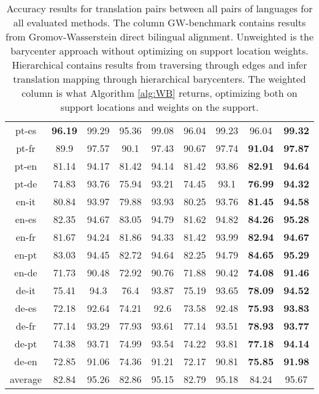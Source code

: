 \documentclass{article}
\begin{document}
\begin{table*}[t]
\begin{tabular}{c|cc|cc|cc|cc}
pt-es  &  \bf 96.19  &  99.29  &  95.36  &  99.08  &  96.04  &  99.23  &  96.04  &  \bf 99.32 \\
pt-fr  &  89.9  &  97.57  &  90.1  &  97.43  &  90.67  &  97.74  &  \bf 91.04  &  \bf 97.87 \\
pt-en  &  81.14  &  94.17  &  81.42  &  94.14  &  81.42  &  93.86  &  \bf 82.91  &  \bf 94.64 \\
pt-de  &  74.83  &  93.76  &  75.94  &  93.21  &  74.45  &  93.1  &  \bf 76.99  &  \bf 94.32 \\
en-it  &  80.84  &  93.97  &  79.88  &  93.93  &  80.25  &  93.76  &  \bf 81.45  &  \bf 94.58 \\
en-es  &  82.35  &  94.67  &  83.05  &  94.79  &  81.62  &  94.82  &  \bf 84.26  &  \bf 95.28 \\
en-fr  &  81.67  &  94.24  &  81.86  &  94.33  &  81.42  &  93.99  &  \bf 82.94  &  \bf 94.67 \\
en-pt  &  83.03  &  94.45  &  82.72  &  94.64  &  82.25  &  94.79  &  \bf 84.65  &  \bf 95.29 \\
en-de  &  71.73  &  90.48  &  72.92  &  90.76  &  71.88  &  90.42  &  \bf 74.08  &  \bf 91.46 \\
de-it  &  75.41  &  94.3  &  76.4  &  93.87  &  75.19  &  93.65  &  \bf 78.09  &  \bf 94.52 \\
de-es  &  72.18  &  92.64  &  74.21  &  92.6  &  73.58  &  92.48  &  \bf 75.93  &  \bf 93.83 \\
de-fr  &  77.14  &  93.29  &  77.93  &  93.61  &  77.14  &  93.51  &  \bf 78.93 &  \bf 93.77 \\
de-pt  &  74.38  &  93.71  &  74.99  &  93.54  &  74.22  &  93.81  &  \bf 77.18  &  \bf 94.14 \\
de-en  &  72.85  &  91.06  &  74.36  &  91.21  &  72.17  &  90.81  &  \bf 75.85  &  \bf 91.98 \\
average  &  82.84  &  95.26  &  82.86  &  95.15  &  82.79  &  95.18  &  84.24  &  95.67
  \\ \hline
\end{tabular}
\caption{Accuracy results for translation pairs between all pairs of languages for all evaluated methods. The column GW-benchmark contains results from Gromov-Wasserstein direct bilingual alignment. Unweighted is the barycenter approach without optimizing on support location weights. Hierarchical contains results from traversing through edges and infer translation mapping through hierarchical barycenters. The weighted column is what Algorithm \ref{alg:WB} returns, optimizing both on support locations and weights on the support.}
\label{table:total-res}
\end{table*} 
\end{document}
